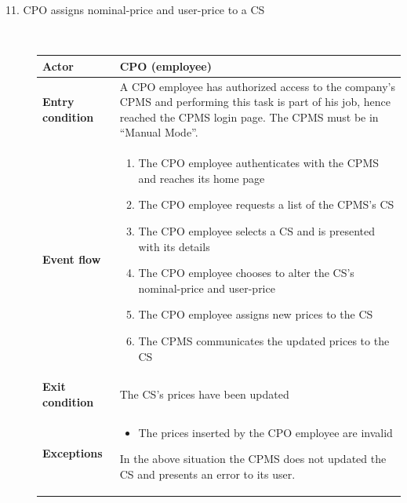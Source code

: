 \documentclass[11pt]{article}
\begin{document}
\begin{description}
    \item [11. CPO assigns nominal-price and user-price to a CS] \hfill \\
    \begin{table}[H]
        \centering
        \setlength{\tabcolsep}{18pt}
        \renewcommand{\arraystretch}{1.4}
        \begin{tabularx}{\textwidth}{|>{\hsize=0.5\hsize}X|>{\hsize=1.5\hsize}X|}
            \hline
            \textbf{Actor} & CPO (employee) \\
            \hline
            \textbf{Entry condition} & A CPO employee has authorized access to the company's CPMS and performing this task is part of his job, hence reached the CPMS login page. The CPMS must be in “Manual Mode”. \\
            \hline
            \textbf{Event flow} & 
                \begin{minipage}[t]{\hsize}
                \begin{enumerate}[topsep=0pt, leftmargin=*]
                    \item The CPO employee authenticates with the CPMS and reaches its home page
                    \item The CPO employee requests a list of the CPMS's CS
                    \item The CPO employee selects a CS and is presented with its details
                    \item The CPO employee chooses to alter the CS's nominal-price and user-price
                    \item The CPO employee assigns new prices to the CS
                    \item The CPMS communicates the updated prices to the CS
                \end{enumerate}
                \end{minipage}
                \vspace{6pt}
            \\
            \hline
            \textbf{Exit condition} & The CS's prices have been updated \\
            \hline
            \textbf{Exceptions} & 
                \begin{minipage}[t]{\hsize}
                \vspace{0pt}
                \begin{itemize}[topsep=0pt, leftmargin=*]
                    \item The prices inserted by the CPO employee are invalid 
                \end{itemize}
                \vspace{8pt}
                \end{minipage}
                In the above situation the CPMS does not updated the CS and presents an error to its user.
                \vspace{6pt}
            \\
            \hline
        \end{tabularx}
    \end{table}
    

\end{description}
\end{document}
